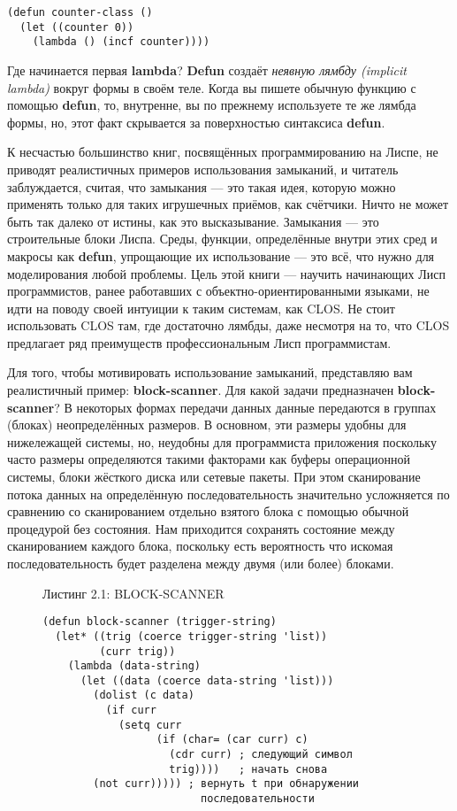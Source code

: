 \begin{verbatim}
(defun counter-class ()
  (let ((counter 0))
    (lambda () (incf counter))))
\end{verbatim}

Где начинается первая \textbf{lambda}? \textbf{Defun} создаёт \emph{неявную лямбду { (implicit lambda)}} вокруг формы в своём теле. Когда вы пишете обычную функцию с помощью \textbf{defun}, то, внутренне, вы по прежнему используете те же лямбда формы, но, этот факт скрывается за поверхностью синтаксиса \textbf{defun}.

К несчастью большинство книг, посвящённых программированию на Лиспе, не приводят реалистичных примеров использования замыканий, и читатель заблуждается, считая, что замыкания --- это такая идея, которую можно применять только для таких игрушечных приёмов, как счётчики. Ничто не может быть так далеко от истины, как это высказывание. Замыкания --- это строительные блоки Лиспа. Среды, функции, определённые внутри этих сред и макросы как \textbf{defun}, упрощающие их использование --- это всё, что нужно для моделирования любой проблемы. Цель этой книги --- научить начинающих Лисп программистов, ранее работавших с объектно-ориентированными языками, не идти на поводу своей интуиции к таким системам, как CLOS. Не стоит использовать CLOS там, где достаточно лямбды, даже несмотря на то, что CLOS предлагает ряд преимуществ профессиональным Лисп программистам.

Для того, чтобы мотивировать использование замыканий, представляю вам реалистичный пример: \textbf{block-scanner}. Для какой задачи предназначен \textbf{block-scanner}? В некоторых формах передачи данных данные передаются в группах (блоках) неопределённых размеров. В основном, эти размеры удобны для нижележащей системы, но, неудобны для программиста приложения поскольку часто размеры определяются такими факторами как буферы операционной системы, блоки жёсткого диска или сетевые пакеты. При этом сканирование потока данных на определённую последовательность значительно усложняется по сравнению со сканированием отдельно взятого блока с помощью обычной процедурой без состояния. Нам приходится сохранять состояние между сканированием каждого блока, поскольку есть вероятность что искомая последовательность будет разделена между двумя (или более) блоками.

\begin{figure}Листинг 2.1: BLOCK-SCANNER\label{listing_2.1}
\listbegin
\begin{verbatim}
(defun block-scanner (trigger-string)
  (let* ((trig (coerce trigger-string 'list))
         (curr trig))
    (lambda (data-string)
      (let ((data (coerce data-string 'list)))
        (dolist (c data)
          (if curr
            (setq curr
                  (if (char= (car curr) c)
                    (cdr curr) ; следующий символ
                    trig))))   ; начать снова
        (not curr))))) ; вернуть t при обнаружении
                         последовательности
\end{verbatim}
\listend
\end{figure}

